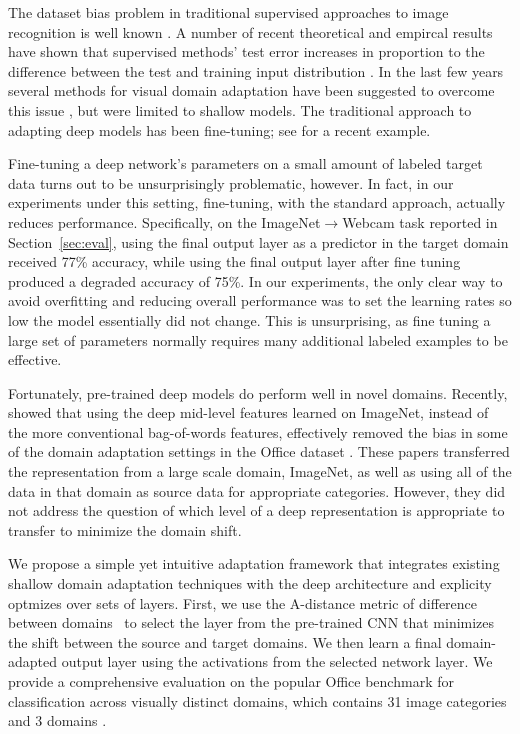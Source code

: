The dataset bias problem in traditional supervised approaches to image
recognition is well known \cite{efros-cvpr11}.  A number of recent theoretical and empircal 
results have shown that supervised methods' test error increases in
proportion to the difference between the test and training input
distribution \cite{ben2007analysis, blitzer2007learning,saenko-eccv10,efros-cvpr11}.  In the last few
years several methods for visual domain adaptation have been suggested
to overcome this
issue \cite{daume,yang-icdm07,aytar-iccv11,saenko-eccv10,kulis-cvpr11,Khosla-eccv12,gopalan-iccv11,gong-cvpr12,hoffman-eccv12,hoffman-iclr13},
but were limited to shallow models. The traditional approach to
adapting deep models has been fine-tuning; see \cite{rcnn} for a
recent example.  

Fine-tuning a deep network's parameters on a small amount of labeled
target data turns out to be unsurprisingly problematic, however.  In
fact, in our experiments under this setting, fine-tuning, with the
standard approach, actually reduces performance.  Specifically, on the
ImageNet$\rightarrow$Webcam task reported in Section~\ref{sec:eval},
using the final output layer as a predictor in the target domain
received 77\% accuracy, while using the final output layer after fine
tuning produced a degraded accuracy of 75\%. In our experiments, the
only clear way to avoid overfitting and reducing overall performance
was to set the learning rates so low the model essentially did not
change. This is unsurprising, as fine tuning a large set of parameters
normally requires many additional labeled examples to be effective.


Fortunately, pre-trained deep models do perform well in novel domains.
Recently, \cite{deeplearning-arxiv-2013,hoffman-iclr14} showed that using the deep
mid-level features learned on ImageNet, instead of the more
conventional bag-of-words features, effectively removed the bias in
some of the domain adaptation settings in the Office
dataset \cite{saenko-eccv10}.   These papers transferred
the representation from a large scale domain, ImageNet, as well as using all of the data in that domain as source data for 
appropriate categories.  However, they did not address the question of which level of a deep representation is appropriate to transfer to minimize the domain shift.

We propose a simple yet intuitive adaptation framework that integrates
existing shallow domain adaptation techniques with the deep
architecture and explicity optmizes over sets of layers.  First, we
use the A-distance metric of difference between domains~\cite{adist} to select the layer from the
pre-trained CNN that minimizes the shift between the source and target
domains.  We then learn a final domain-adapted output layer using the
activations from the selected network layer.  We provide a
comprehensive evaluation on the popular Office benchmark for
classification across visually distinct domains, which contains 31
image categories and 3 domains \cite{saenko-eccv10}.

